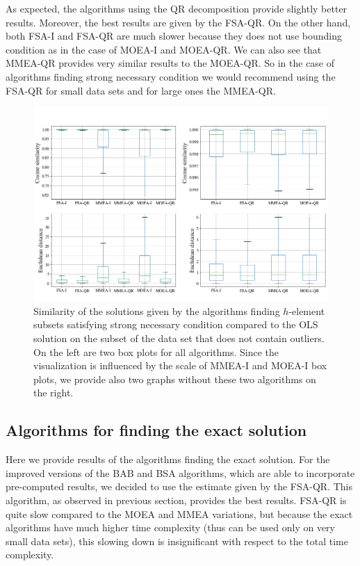 As expected, the algorithms using the QR decomposition provide slightly better results. Moreover, the best results are given by the FSA-QR. On the other hand, both FSA-I and FSA-QR are much slower because they does not use bounding condition as in the case of MOEA-I and MOEA-QR. We can also see that MMEA-QR provides very similar results to the MOEA-QR. So in the case of algorithms finding strong necessary condition we would recommend using the FSA-QR for small data sets and for large ones the MMEA-QR. 

\begin{figure}[h]
    \centering
    \includegraphics[width=14cm]{img/all_distances_feasible}

    \caption{Similarity of the solutions given by the algorithms finding $h$-element subsets satisfying strong necessary condition compared to the OLS solution on the subset of the data set that does not contain outliers. On the left are two box plots for all algorithms. Since the visualization is influenced by the scale of MMEA-I and MOEA-I box plots, we provide also two graphs without these two algorithms on the right.}
    \label{all_distances}
\end{figure}

\subsection{Algorithms for finding the exact solution}
Here we provide results of the algorithms finding the exact solution. For the improved versions of the BAB and BSA algorithms, which are able to incorporate pre-computed results, we decided to use the estimate given by the FSA-QR. This algorithm, as observed in previous section, provides the best results. FSA-QR is quite slow compared to the MOEA and MMEA variations, but because the exact algorithms have much higher time complexity (thus can be used only on very small data sets), this slowing down is insignificant with respect to the total time complexity.


